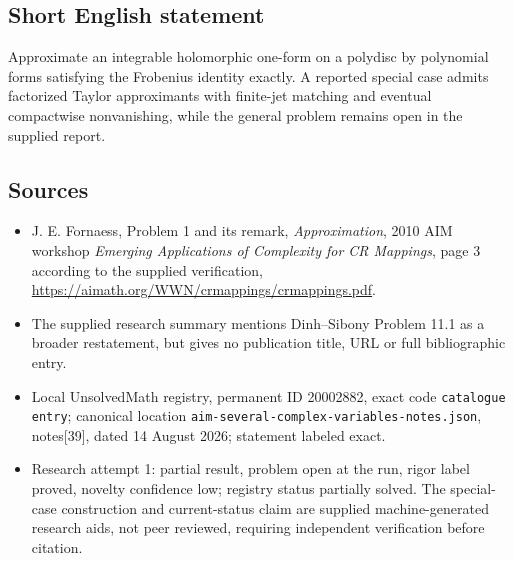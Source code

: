 \documentclass[11pt]{article}
\begin{document}
\subsection{Short English statement}
Approximate an integrable holomorphic one-form on a polydisc by polynomial forms satisfying the Frobenius identity exactly. A reported special case admits factorized Taylor approximants with finite-jet matching and eventual compactwise nonvanishing, while the general problem remains open in the supplied report.
\subsection{Sources}
\begin{itemize}
\item J. E. Fornaess, Problem 1 and its remark, \emph{Approximation}, 2010 AIM workshop \emph{Emerging Applications of Complexity for CR Mappings}, page 3 according to the supplied verification, \url{https://aimath.org/WWN/crmappings/crmappings.pdf}.
\item The supplied research summary mentions Dinh--Sibony Problem 11.1 as a broader restatement, but gives no publication title, URL or full bibliographic entry.
\item Local UnsolvedMath registry, permanent ID 20002882, exact code \texttt{catalogue entry}; canonical location \texttt{aim-several-complex-variables-notes.json}, notes[39], dated 14 August 2026; statement labeled exact.
\item Research attempt 1: partial result, problem open at the run, rigor label proved, novelty confidence low; registry status partially solved. The special-case construction and current-status claim are supplied machine-generated research aids, not peer reviewed, requiring independent verification before citation.
\end{itemize}
\end{document}
